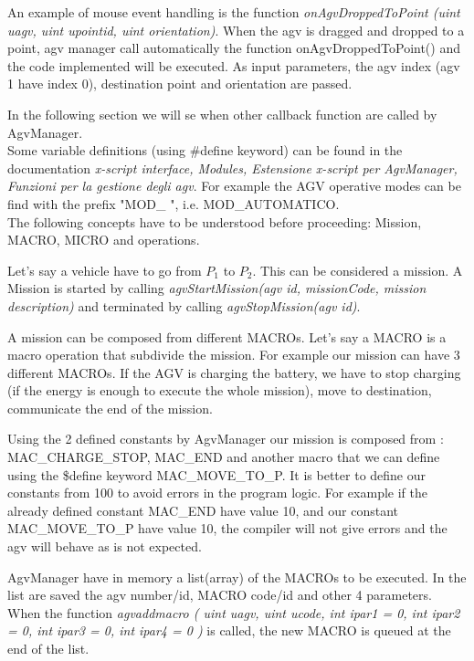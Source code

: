 An example of mouse event handling is the function \textit{onAgvDroppedToPoint (uint uagv, uint upointid, uint orientation)}.
When the agv is dragged and dropped to a point, agv manager call automatically the function onAgvDroppedToPoint() and the code implemented will be executed. As input parameters, the agv index (agv 1 have index 0), destination point and orientation are passed.

In the following section we will se when other callback function are called by AgvManager.\\

Some variable definitions (using \#define keyword) can be found in the documentation \textit{x-script interface, Modules, Estensione x-script per AgvManager, Funzioni per la gestione degli agv}. For example the AGV operative modes can be find with the prefix "MOD\_ ", i.e. MOD\_AUTOMATICO.\\

The following concepts have to be understood before proceeding: Mission, MACRO, MICRO and operations.

Let's say a vehicle have to go from $P_{1}$ to $P_{2}$. This can be considered a mission. A Mission is started by calling \textit{agvStartMission(agv id, missionCode, mission description)} and terminated by calling \textit{agvStopMission(agv id)}.

A mission can be composed from different MACROs. Let's say a MACRO is a macro operation that subdivide the mission. For example our mission can have 3 different MACROs. If the AGV is charging the battery, we have to stop charging (if the energy is enough to execute the whole mission), move to destination, communicate the end of the mission.

Using the 2 defined constants by AgvManager our mission is composed from : MAC\_CHARGE\_STOP, MAC\_END and another macro that we can define using the \$define keyword MAC\_MOVE\_TO\_P.
It is better to define our constants from 100 to avoid errors in the program logic. For example if the already defined constant MAC\_END have value 10, and our constant MAC\_MOVE\_TO\_P have value 10, the compiler will not give errors and the agv will behave as is not expected.

AgvManager have in memory a list(array) of the MACROs to be executed. In the list are saved the agv number/id, MACRO code/id and other 4 parameters. 
When the function 
\textit{agvaddmacro	(	uint 	uagv,
	uint 	ucode,
	int 	ipar1 = 0,
	int 	ipar2 = 0,
	int 	ipar3 = 0,
	int 	ipar4 = 0 
	)		} 
is called, the new MACRO is queued at the end of the list.

